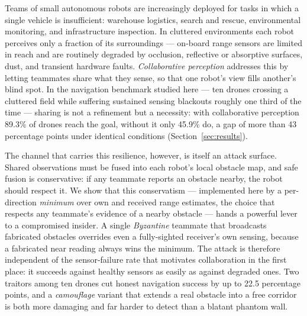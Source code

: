
Teams of small autonomous robots are increasingly deployed for tasks in
which a single vehicle is insufficient: warehouse logistics, search and
rescue, environmental monitoring, and infrastructure inspection. In
cluttered environments each robot perceives only a fraction of its
surroundings --- on-board range sensors are limited in reach and are
routinely degraded by occlusion, reflective or absorptive surfaces, dust,
and transient hardware faults. \emph{Collaborative perception} addresses
this by letting teammates share what they sense, so that one robot's view
fills another's blind spot. In the navigation benchmark studied here --- ten
drones crossing a cluttered field while suffering sustained sensing
blackouts roughly one third of the time --- sharing is not a refinement but
a necessity: with collaborative perception 89.3\% of drones reach the goal,
without it only 45.9\% do, a gap of more than 43 percentage points under
identical conditions (Section~\ref{sec:results}).

The channel that carries this resilience, however, is itself an attack
surface. Shared observations must be fused into each robot's local obstacle
map, and safe fusion is conservative: if any teammate reports an obstacle
nearby, the robot should respect it. We show that this conservatism ---
implemented here by a per-direction \emph{minimum} over own and
received range estimates, the choice that respects any teammate's evidence
of a nearby obstacle --- hands a powerful lever to a compromised
insider. A single \emph{Byzantine} teammate that broadcasts fabricated
obstacles overrides even a fully-sighted receiver's own sensing, because a
fabricated near reading always wins the minimum. The attack is therefore
independent of the sensor-failure rate that motivates collaboration in the
first place: it succeeds against healthy sensors as easily as against
degraded ones. Two traitors among ten drones cut honest navigation success
by up to 22.5 percentage points, and a \emph{camouflage} variant that
extends a real obstacle into a free corridor is both more damaging and far
harder to detect than a blatant phantom wall.

